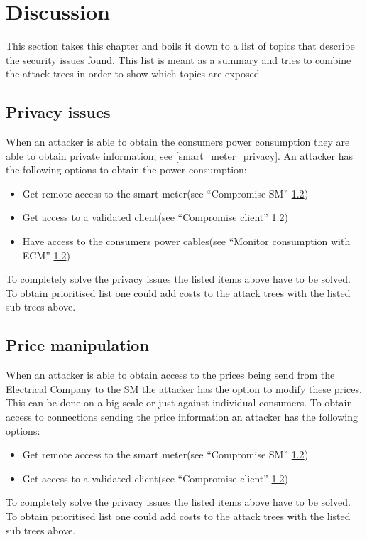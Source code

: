 \section{Discussion}
This section takes this chapter and boils it down to a list of topics that describe the security issues found.
This list is meant as a summary and tries to combine the attack trees in order to show which topics are exposed.




\subsection{Privacy issues}
When an attacker is able to obtain the consumers power consumption they are able to obtain private information, see \cref{smart_meter_privacy}.
An attacker has the following options to obtain the power consumption:
\begin{itemize}
\item Get remote access to the smart meter(see ``Compromise SM'' \cref{})
\item Get access to a validated client(see ``Compromise client'' \cref{})
\item Have access to the consumers power cables(see ``Monitor consumption with ECM'' \cref{})
\end{itemize}

To completely solve the privacy issues the listed items above have to be solved.
To obtain prioritised list one could add costs to the attack trees with the listed sub trees above.


\subsection{Price manipulation}
When an attacker is able to obtain access to the prices being send from the Electrical Company to the SM the attacker has the option to modify these prices.
This can be done on a big scale or just against individual consumers.
To obtain access to connections sending the  price information an attacker has the following options:
\begin{itemize}
\item Get remote access to the smart meter(see ``Compromise SM'' \cref{})
\item Get access to a validated client(see ``Compromise client'' \cref{})
\end{itemize}

To completely solve the privacy issues the listed items above have to be solved.
To obtain prioritised list one could add costs to the attack trees with the listed sub trees above.

